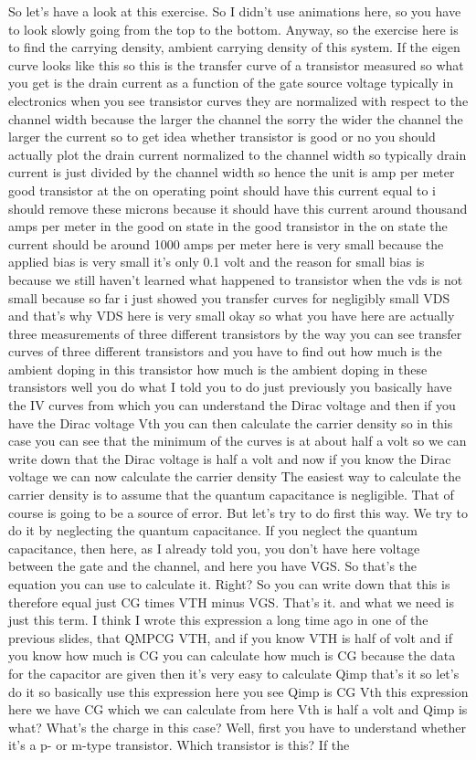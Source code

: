 So let's have a look at this exercise. So I didn't use animations here, so you have to look slowly going from the top to the bottom. Anyway, so the exercise here is to find the carrying density, ambient carrying density of this system. If the eigen curve looks like this so this is the transfer curve of a transistor measured so what you get is the drain current as a function of the gate source voltage typically in electronics when you see transistor curves they are normalized with respect to the channel width because the larger the channel the sorry the wider the channel the larger the current so to get idea whether transistor is good or no you should actually plot the drain current normalized to the channel width so typically drain current is just divided by the channel width so hence the unit is amp per meter good transistor at the on operating point should have this current equal to i should remove these microns because it should have this current around thousand amps per meter in the good on state in the good transistor in the on state the current should be around 1000 amps per meter here is very small because the applied bias is very small it's only 0.1 volt and the reason for small bias is because we still haven't learned what happened to transistor when the vds is not small because so far i just showed you transfer curves for negligibly small VDS and that's why VDS here is very small okay so what you have here are actually three measurements of three different transistors by the way you can see transfer curves of three different transistors and you have to find out how much is the ambient doping in this transistor how much is the ambient doping in these transistors well you do what I told you to do just previously you basically have the IV curves from which you can understand the Dirac voltage and then if you have the Dirac voltage Vth you can then calculate the carrier density so in this case you can see that the minimum of the curves is at about half a volt so we can write down that the Dirac voltage is half a volt and now if you know the Dirac voltage we can now calculate the carrier density The easiest way to calculate the carrier density is to assume that the quantum capacitance is negligible. That of course is going to be a source of error. But let's try to do first this way. We try to do it by neglecting the quantum capacitance. If you neglect the quantum capacitance, then here, as I already told you, you don't have here voltage between the gate and the channel, and here you have VGS. So that's the equation you can use to calculate it. Right? So you can write down that this is therefore equal just CG times VTH minus VGS. That's it. and what we need is just this term. I think I wrote this expression a long time ago in one of the previous slides, that QMPCG VTH, and if you know VTH is half of volt and if you know how much is CG you can calculate how much is CG because the data for the capacitor are given then it's very easy to calculate Qimp that's it so let's do it so basically use this expression here you see Qimp is CG Vth this expression here we have CG which we can calculate from here Vth is half a volt and Qimp is what? What's the charge in this case? Well, first you have to understand whether it's a p- or m-type transistor. Which transistor is this? If the 